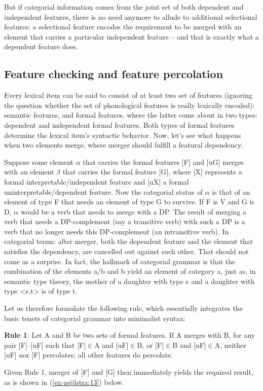 \documentclass[output=paper
,modfonts
,nonflat]{langsci/langscibook}
\begin{document}
But if categorial information comes from the joint set of both dependent and independent features, there is no need anymore to allude to additional selectional features: a selectional feature encodes the requirement to be merged with an element that carries a particular independent feature – and that is exactly what a dependent feature does.

\subsection{Feature checking and feature percolation}
Every lexical item can be said to consist of at least two set of features (ignoring the question whether the set of phonological features is really lexically encoded): semantic features, and formal features, where the latter come about in two types: dependent and independent formal features. Both types of formal features determine the lexical item’s syntactic behavior. Now, let’s see what happens when two elements merge, where merger should fulfill a featural dependency.

Suppose some element $\alpha$ that carries the formal features {[}F{]} and {[}uG{]} merges with an element $\beta$ that carries the formal feature {[}G{]}, where {[}X{]} represents a formal interpretable/independent feature and {[}uX{]} a formal uninterpretable/dependent feature. Now the categorial status of $\alpha$ is that of an element of type F that needs an element of type G to survive. If F is V and G is D, $\alpha$ would be a verb that needs to merge with a DP. The result of merging a verb that needs a DP-complement (say a transitive verb) with such a DP is a verb that no longer needs this DP-complement (an intransitive verb). In categorial terms: after merger, both the dependent feature and the element that satisfies the dependency, are cancelled out against each other. That should not come as a surprise. In fact, the hallmark of categorial grammar is that the combination of the elements a/b and b yield an element of category a, just as, in semantic type theory, the mother of a daughter with type e and a daughter with type <e,t> is of type t. 

Let us therefore formulate the following rule, which essentially integrates the basic tenets of categorial grammar into minimalist syntax:

\begin{exe}
\ex \label{ex-zeijlstra:12}\textbf{Rule 1}: Let A and B be two sets of formal features. If A merges with B, for any pair {[}F{]}--{[}uF{]} such that {[}F{]}$\in$A and {[}uF{]}$\in$B, or {[}F{]}$\in$B and {[}uF{]}$\in$A, neither {[}uF{]} nor {[}F{]} percolates; all other features do percolate.
\end{exe}
Given Rule 1, merger of {[}F{]} and {[}G{]} then immediately yields the required result, as is shown in (\ref{ex-zeijlstra:13}) below.
\end{document}
